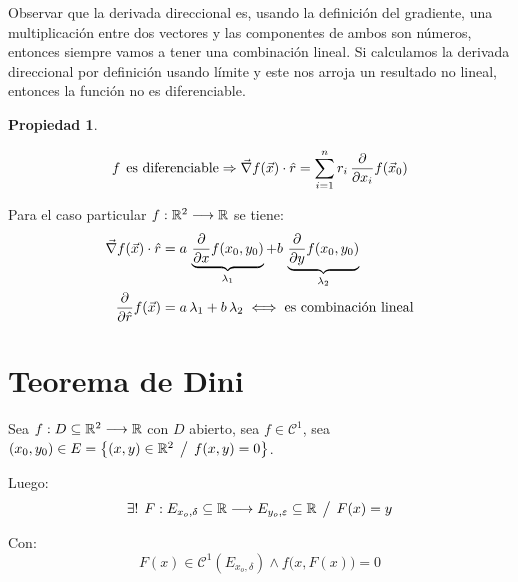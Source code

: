 \documentclass[a5paper,12pt,twoside]{book}
\newtheorem{prop}{{Propiedad}}[chapter]
\begin{document}
Observar que la derivada direccional es, usando la definición del gradiente, una multiplicación entre dos vectores y las componentes de ambos son números, entonces siempre vamos a tener una combinación lineal. Si calculamos la derivada direccional por definición usando límite y este nos arroja un resultado no lineal, entonces la función no es diferenciable.

\begin{mdframed}[style=MyFrame1]
    \begin{prop}
    \end{prop}
    \begin{equation*}
        f \hspace{1ex} \textrm{es diferenciable} \Rightarrow \Vec{\nabla} f(\Vec{x}) \cdot \hat{r} = \sum_{i=1}^n r_i \, \frac{\partial}{\partial x_i} f(\Vec{x}_0)
    \end{equation*}
\end{mdframed}

Para el caso particular $f:\mathbb{R}^2 \longrightarrow \mathbb{R}$ se tiene:
\begin{align*}
    \Vec{\nabla} f(\Vec{x}) \cdot \hat{r} &= a \, \underbrace{\dfrac{\partial}{\partial x} f(x_0,y_0)}_{\lambda_1} + b \, \underbrace{\dfrac{\partial}{\partial y} f(x_0,y_0)}_{\lambda_2}
    \\
    \frac{\partial}{\partial \hat{r}} f(\Vec{x}) &= a\,\lambda_1 + b\,\lambda_2 \iff \textrm{es combinación lineal}
\end{align*}


\section{Teorema de Dini} %

Sea $f:D \subseteq \mathbb{R}^2 \longrightarrow \mathbb{R}$ con $D$ abierto, sea $f \in \mathcal{C}^1$, sea $(x_0,y_0) \in E = { \left\{ { (x,y) \in \mathbb{R}^2 \hspace{1ex} \big/ \hspace{1ex} f(x,y)=0 } \right\} }$.

Luego:
\begin{equation*}
    \exists ! \hspace{1ex} F:E_{x_o, \delta} \subseteq \mathbb{R} \longrightarrow E_{y_o, \varepsilon} \subseteq \mathbb{R} \hspace{1ex} \big/ \hspace{1ex} F(x)=y
\end{equation*}

Con:
\begin{equation*}
    F(x) \in \mathcal{C}^1(E_{x_o, \delta}) \land f \big( x,F(x) \big) = 0
\end{equation*}
\end{document}
